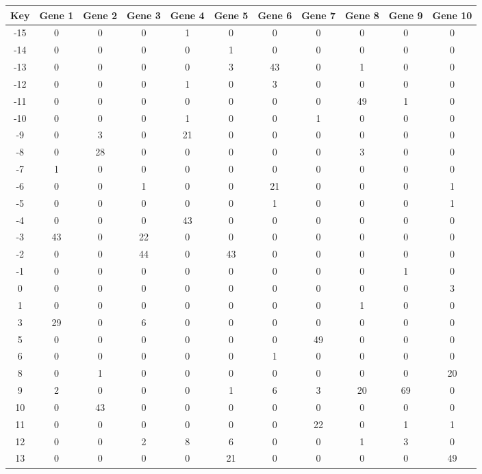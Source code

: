\begin{tabular}{|c|c|c|c|c|c|c|c|c|c|c|}
\hline
Key & Gene 1 & Gene 2 & Gene 3 & Gene 4 & Gene 5 & Gene 6 & Gene 7 & Gene 8 & Gene 9 & Gene 10 \\
\hline
-15 & 0 & 0 & 0 & 1 & 0 & 0 & 0 & 0 & 0 & 0 \\
-14 & 0 & 0 & 0 & 0 & 1 & 0 & 0 & 0 & 0 & 0 \\
-13 & 0 & 0 & 0 & 0 & 3 & 43 & 0 & 1 & 0 & 0 \\
-12 & 0 & 0 & 0 & 1 & 0 & 3 & 0 & 0 & 0 & 0 \\
-11 & 0 & 0 & 0 & 0 & 0 & 0 & 0 & 49 & 1 & 0 \\
-10 & 0 & 0 & 0 & 1 & 0 & 0 & 1 & 0 & 0 & 0 \\
-9 & 0 & 3 & 0 & 21 & 0 & 0 & 0 & 0 & 0 & 0 \\
-8 & 0 & 28 & 0 & 0 & 0 & 0 & 0 & 3 & 0 & 0 \\
-7 & 1 & 0 & 0 & 0 & 0 & 0 & 0 & 0 & 0 & 0 \\
-6 & 0 & 0 & 1 & 0 & 0 & 21 & 0 & 0 & 0 & 1 \\
-5 & 0 & 0 & 0 & 0 & 0 & 1 & 0 & 0 & 0 & 1 \\
-4 & 0 & 0 & 0 & 43 & 0 & 0 & 0 & 0 & 0 & 0 \\
-3 & 43 & 0 & 22 & 0 & 0 & 0 & 0 & 0 & 0 & 0 \\
-2 & 0 & 0 & 44 & 0 & 43 & 0 & 0 & 0 & 0 & 0 \\
-1 & 0 & 0 & 0 & 0 & 0 & 0 & 0 & 0 & 1 & 0 \\
0 & 0 & 0 & 0 & 0 & 0 & 0 & 0 & 0 & 0 & 3 \\
1 & 0 & 0 & 0 & 0 & 0 & 0 & 0 & 1 & 0 & 0 \\
3 & 29 & 0 & 6 & 0 & 0 & 0 & 0 & 0 & 0 & 0 \\
5 & 0 & 0 & 0 & 0 & 0 & 0 & 49 & 0 & 0 & 0 \\
6 & 0 & 0 & 0 & 0 & 0 & 1 & 0 & 0 & 0 & 0 \\
8 & 0 & 1 & 0 & 0 & 0 & 0 & 0 & 0 & 0 & 20 \\
9 & 2 & 0 & 0 & 0 & 1 & 6 & 3 & 20 & 69 & 0 \\
10 & 0 & 43 & 0 & 0 & 0 & 0 & 0 & 0 & 0 & 0 \\
11 & 0 & 0 & 0 & 0 & 0 & 0 & 22 & 0 & 1 & 1 \\
12 & 0 & 0 & 2 & 8 & 6 & 0 & 0 & 1 & 3 & 0 \\
13 & 0 & 0 & 0 & 0 & 21 & 0 & 0 & 0 & 0 & 49 \\
\hline
\end{tabular}